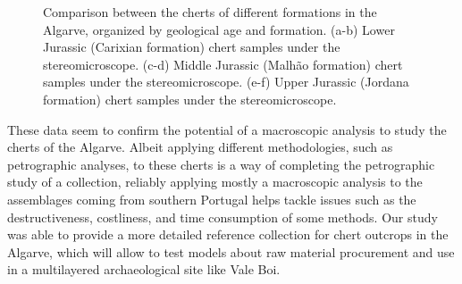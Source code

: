 \documentclass[
  a4paper,
  DIV=11,
  numbers=noendperiod]{scrreprt}
\begin{document}
\begin{figure}


\caption{\label{fig-frames-macrocomparison}Comparison between the cherts
of different formations in the Algarve, organized by geological age and
formation. (a-b) Lower Jurassic (Carixian formation) chert samples under
the stereomicroscope. (c-d) Middle Jurassic (Malhão formation) chert
samples under the stereomicroscope. (e-f) Upper Jurassic (Jordana
formation) chert samples under the stereomicroscope.}

\end{figure}%

These data seem to confirm the potential of a macroscopic analysis to
study the cherts of the Algarve. Albeit applying different
methodologies, such as petrographic analyses, to these cherts is a way
of completing the petrographic study of a collection, reliably applying
mostly a macroscopic analysis to the assemblages coming from southern
Portugal helps tackle issues such as the destructiveness, costliness,
and time consumption of some methods. Our study was able to provide a
more detailed reference collection for chert outcrops in the Algarve,
which will allow to test models about raw material procurement and use
in a multilayered archaeological site like Vale Boi.
\end{document}
